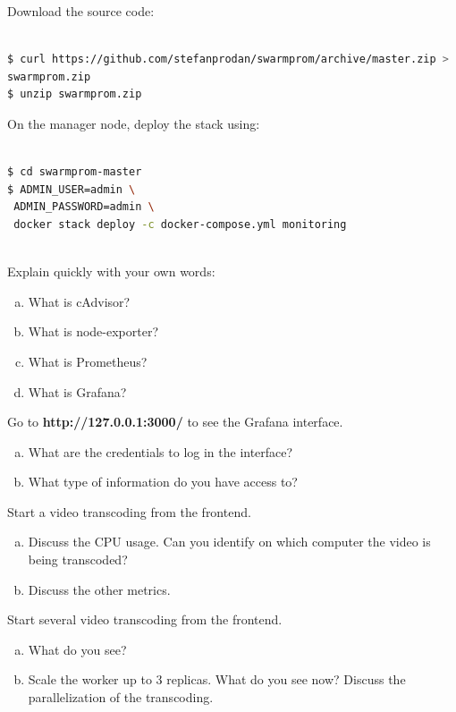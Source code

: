 \documentclass[a4paper,11pt]{exam}
\begin{document}
Download the source code:

\begin{lstlisting}[frame=single,language={sh}]  % Start your code-block

$ curl https://github.com/stefanprodan/swarmprom/archive/master.zip >  \
swarmprom.zip
$ unzip swarmprom.zip

\end{lstlisting}

On the manager node, deploy the stack using: 

\begin{lstlisting}[frame=single,language={sh}]  % Start your code-block

$ cd swarmprom-master
$ ADMIN_USER=admin \
 ADMIN_PASSWORD=admin \
 docker stack deploy -c docker-compose.yml monitoring
 
\end{lstlisting}

\begin{questions}

	\question Explain quickly with your own words:
	\begin{enumerate}[(a)]
		\item What is cAdvisor?
		\item What is node-exporter?
		\item What is Prometheus?
		\item What is Grafana?
	\end{enumerate}
	
	\question Go to \textbf{http://127.0.0.1:3000/} to see the Grafana interface.
	\begin{enumerate}[(a)]
		\item What are the credentials to log in the interface?
		\item What type of information do you have access to?
	\end{enumerate}
	
	\question Start a video transcoding from the frontend.
	\begin{enumerate}[(a)]
		\item Discuss the CPU usage. Can you identify on which computer the video is being transcoded?
		\item Discuss the other metrics.
	\end{enumerate}

	\question Start several video transcoding from the frontend.
	\begin{enumerate}[(a)]
		\item What do you see?  
		\item Scale the worker up to 3 replicas. What do you see now? Discuss the parallelization of the transcoding.
	\end{enumerate}
	
\end{questions}
\end{document}
